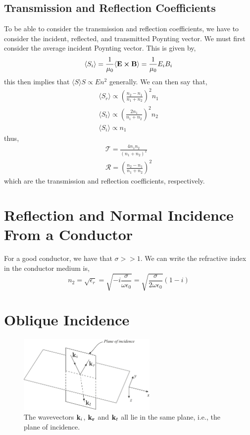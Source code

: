 \documentclass{book}
\begin{document}
\subsection{Transmission and Reflection Coefficients}
To be able to consider the transmission and reflection coefficients, we have to consider the incident, reflected, and transmitted Poynting vector. We must first consider the average incident Poynting vector. This is given by,
\begin{equation}
	\langle S_i \rangle = \frac{1}{\mu_0}\langle \vb{E} \cross \vb{B}\rangle = \frac{1}{\mu_0}E_iB_i
\end{equation}
this then implies that $\langle S \rangle S \propto En^2$ generally. We can then say that,
\begin{align}
	\langle S_r\rangle \propto \left(\frac{n_2 - n_1}{n_1 + n_2}\right)^2n_1 \\
	\langle S_t \rangle \propto \left(\frac{2n_1}{n_1 + n_2}\right)^2n_2 \\
	\langle S_i \rangle \propto n_1 
\end{align}
thus,
\begin{align}
	\boxed{\mathcal{T} = \frac{4n_1n_2}{(n_1+n_2)^2}} \\
	\boxed{\mathcal{R} = \left(\frac{n_2 - n_1}{n_1 + n_2}\right)^2 }
\end{align}
which are the transmission and reflection coefficients, respectively.
\section{Reflection and Normal Incidence From a Conductor}
For a good conductor, we have that $\sigma >> 1$. We can write the refractive index in the conductor medium is,
\begin{equation}
	n_2 = \sqrt{\epsilon_r} = \sqrt{-i\frac{\sigma}{\omega\epsilon_0}} = \sqrt{\frac{\sigma}{2\omega\epsilon_0}}(1 - i)
\end{equation}
\section{Oblique Incidence}
\begin{figure}[h]
	\centering
	\includegraphics[width=0.6\textwidth]{oblique incidence.png}
	\caption{The wavevectors $\vb{k}_i$, $\vb{k_r}$ and $\vb{k}_t$ all lie in the same plane, i.e., the plane of incidence.}
	\label{fig:oblique}
\end{figure}
\end{document}
